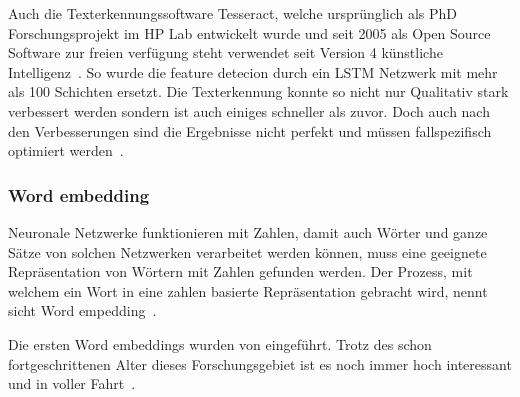 \documentclass{hwz}
\begin{document}

Auch die Texterkennungssoftware Tesseract, welche ursprünglich als PhD Forschungsprojekt im HP Lab entwickelt wurde und seit 2005 als Open Source Software zur freien verfügung steht verwendet seit Version 4 künstliche Intelligenz~\autocite{Smith2007AnEngine, o.V.20184.0LSTM}. So wurde die feature detecion durch ein LSTM Netzwerk mit mehr als 100 Schichten ersetzt. Die Texterkennung konnte so nicht nur Qualitativ stark verbessert werden sondern ist auch einiges schneller als zuvor. Doch auch nach den Verbesserungen sind die Ergebnisse nicht perfekt und müssen fallspezifisch optimiert werden~\autocite{o.V.20184.0Performance, o.V.20184.0LSTM}.

\subsubsection{Word embedding}

Neuronale Netzwerke funktionieren mit Zahlen, damit auch Wörter und ganze Sätze von solchen Netzwerken verarbeitet werden können, muss eine geeignete Repräsentation von Wörtern mit Zahlen gefunden werden. Der Prozess, mit welchem ein Wort in eine zahlen basierte Repräsentation gebracht wird, nennt sicht Word empedding~\autocite{Olah2014DeepRepresentations}.

Die ersten Word embeddings wurden von \textcite{Bengio2001Advances13} eingeführt. Trotz des schon fortgeschrittenen Alter dieses Forschungsgebiet ist es noch immer hoch interessant und in voller Fahrt~\autocite{Olah2014DeepRepresentations}.
\end{document}
